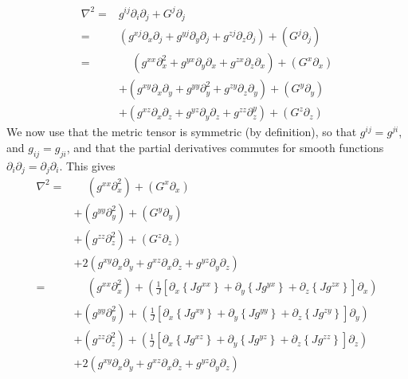 \documentclass[12pt]{article}
\def\L{\left}
\def\R{\right}
\newcommand{\Grad}{\ensuremath{\nabla}}
\begin{document}
\begin{align*}
    \Grad^2 =& g^{ij} \partial_i \partial_j + G^j \partial_j\\
%
            =& \L(  g^{xj} \partial_x \partial_j
                  + g^{yj} \partial_y \partial_j
                  + g^{zj} \partial_z \partial_j\R)
               + \L(G^j \partial_j\R)\\
%
            =& \quad \,
               \L(  g^{xx} \partial_x^2
                  + g^{yx} \partial_y \partial_x
                  + g^{zx} \partial_z \partial_x\R)
               + \L(G^x \partial_x\R)\\
            &+ \L(  g^{xy} \partial_x \partial_y
                  + g^{yy} \partial_y^2
                  + g^{zy} \partial_z \partial_y\R)
               + \L(G^y \partial_y\R)\\
            &+ \L(  g^{xz} \partial_x \partial_z
                  + g^{yz} \partial_y \partial_z
                  + g^{zz} \partial_z^y\R)
               + \L(G^z \partial_z\R)
\end{align*}
%
We now use that the metric tensor is symmetric (by definition), so that
$g^{ij}=g^{ji}$, and $g_{ij}=g_{ji}$, and that the partial derivatives
commutes for smooth functions $\partial_i\partial_j=\partial_j\partial_i$.
This gives
%
\begin{align*}
    \Grad^2 =&\quad \,
               \L(g^{xx} \partial_x^2 \R)
               + \L(G^x \partial_x\R)\\
            &+ \L(g^{yy} \partial_y^2 \R)
               + \L(G^y \partial_y\R)\\
            &+ \L(g^{zz} \partial_z^2\R)
               + \L(G^z \partial_z\R)\\
            &+ 2\L( g^{xy} \partial_x \partial_y
                  + g^{xz} \partial_x \partial_z
                  + g^{yz} \partial_y \partial_z
                  \R)\\
%
       =&\quad \,
               \L(g^{xx} \partial_x^2\R)
               + \L(
                    \frac{1}{J} \L[
                      \partial_x \L\{J g^{xx} \R\}
                    + \partial_y \L\{J g^{yx} \R\}
                    + \partial_z \L\{J g^{zx} \R\}
                    \R]
                    \partial_x\R)\\
            &+ \L(g^{yy} \partial_y^2\R)
               + \L(
                    \frac{1}{J} \L[
                      \partial_x \L\{J g^{xy} \R\}
                    + \partial_y \L\{J g^{yy} \R\}
                    + \partial_z \L\{J g^{zy} \R\}
                    \R]
                    \partial_y\R)\\
            &+ \L(g^{zz} \partial_z^2\R)
               + \L(
                    \frac{1}{J} \L[
                      \partial_x \L\{J g^{xz} \R\}
                    + \partial_y \L\{J g^{yz} \R\}
                    + \partial_z \L\{J g^{zz} \R\}
                    \R]
                    \partial_z\R)\\
            &+ 2\L( g^{xy} \partial_x \partial_y
                  + g^{xz} \partial_x \partial_z
                  + g^{yz} \partial_y \partial_z
                  \R)
\end{align*}
\end{document}
